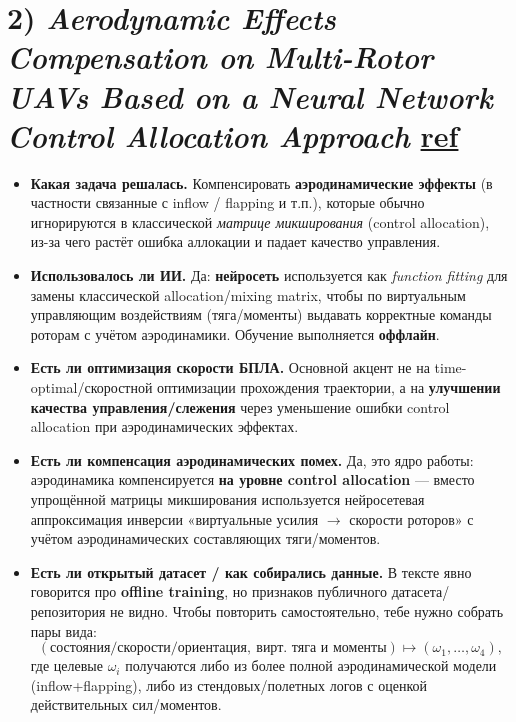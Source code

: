 \section*{2) \textit{Aerodynamic Effects Compensation on Multi-Rotor UAVs Based on a Neural Network Control Allocation Approach} \href{https://www.ieee-jas.net/en/article/doi/10.1109/JAS.2021.1004266}{ref}}
\begin{itemize}
  \item \textbf{Какая задача решалась.}
  Компенсировать \textbf{аэродинамические эффекты} (в частности связанные с inflow / flapping и т.п.), которые обычно игнорируются в классической \emph{матрице микширования} (control allocation), из-за чего растёт ошибка аллокации и падает качество управления.

  \item \textbf{Использовалось ли ИИ.}
  Да: \textbf{нейросеть} используется как \emph{function fitting} для замены классической allocation/mixing matrix, чтобы по виртуальным управляющим воздействиям (тяга/моменты) выдавать корректные команды роторам с учётом аэродинамики. Обучение выполняется \textbf{оффлайн}.

  \item \textbf{Есть ли оптимизация скорости БПЛА.}
  Основной акцент не на time-optimal/скоростной оптимизации прохождения траектории, а на \textbf{улучшении качества управления/слежения} через уменьшение ошибки control allocation при аэродинамических эффектах.

  \item \textbf{Есть ли компенсация аэродинамических помех.}
  Да, это ядро работы: аэродинамика компенсируется \textbf{на уровне control allocation} — вместо упрощённой матрицы микширования используется нейросетевая аппроксимация инверсии «виртуальные усилия $\to$ скорости роторов» с учётом аэродинамических составляющих тяги/моментов.

  \item \textbf{Есть ли открытый датасет / как собирались данные.}
  В тексте явно говорится про \textbf{offline training}, но признаков публичного датасета/репозитория не видно.
  Чтобы повторить самостоятельно, тебе нужно собрать пары вида:
  \[
    (\text{состояния/скорости/ориентация},\ \text{вирт. тяга и моменты}) \mapsto (\omega_1,\dots,\omega_4),
  \]
  где целевые $\omega_i$ получаются либо из более полной аэродинамической модели (inflow+flapping), либо из стендовых/полетных логов с оценкой действительных сил/моментов.
\end{itemize}


